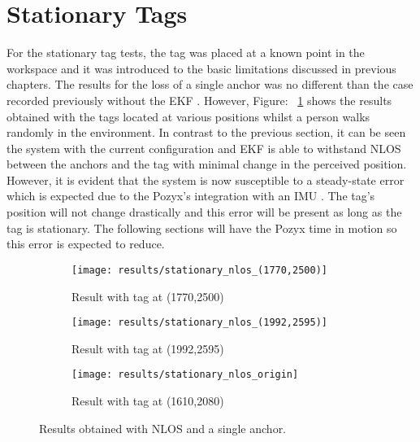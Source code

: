 \newpage
\section{Stationary Tags}\label{sec:stationary-tags}
For the stationary tag tests, the tag was placed at a known point in the workspace and it was introduced to the basic limitations discussed in previous chapters.
The results for the loss of a single anchor was no different than the case recorded previously without the EKF .
However, Figure: ~\ref{fig:stat_anchors} shows the results obtained with the tags located at various positions whilst a person walks randomly in the environment.
In contrast to the previous section, it can be seen the system with the current configuration and EKF is able to withstand NLOS between the anchors and the tag with minimal change in the perceived position.
However, it is evident that the system is now susceptible to a steady-state error which is expected due to the Pozyx's integration with an IMU .
The tag's position will not change drastically and this error will be present as long as the tag is stationary.
The following sections will have the Pozyx time in motion so this error is expected to reduce.

\begin{figure}[h!]
    \centering
    \begin{subfigure}{0.49\textwidth}
            \texttt{[image: results/stationary\_nlos\_(1770,2500)]}
            \caption{Result with tag at (1770,2500)}
    \end{subfigure}
    \begin{subfigure}{0.49\textwidth}
            \texttt{[image: results/stationary\_nlos\_(1992,2595)]}
            \caption{Result with tag at (1992,2595)}
    \end{subfigure}
    \begin{subfigure}{0.5\textwidth}
            \texttt{[image: results/stationary\_nlos\_origin]}
            \caption{Result with tag at (1610,2080)}
    \end{subfigure}
    \caption{Results obtained with NLOS and a single anchor.}
    \label{fig:stat_anchors}
\end{figure}
\newpage
